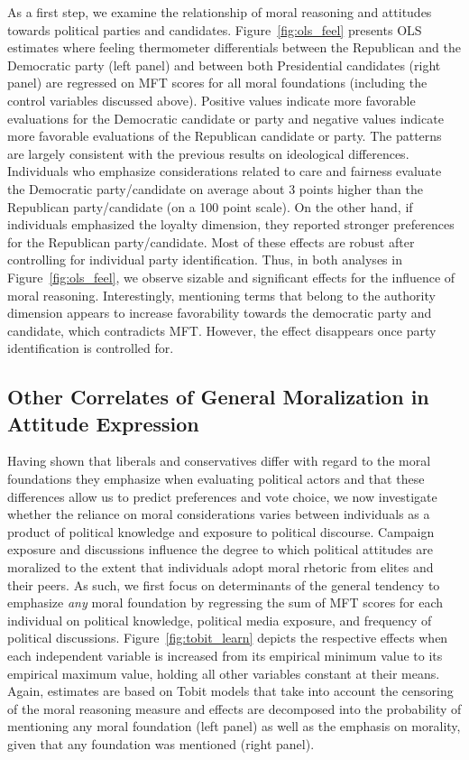 \documentclass[12pt]{article}
\begin{document}
As a first step, we examine the relationship of moral reasoning and attitudes towards political parties and candidates. Figure~\ref{fig:ols_feel} presents OLS estimates where feeling thermometer differentials between the Republican and the Democratic party (left panel) and between both Presidential candidates (right panel) are regressed on MFT scores for all moral foundations (including the control variables discussed above). Positive values indicate more favorable evaluations for the Democratic candidate or party and negative values indicate more favorable evaluations of the Republican candidate or party. The patterns are largely consistent with the previous results on ideological differences. Individuals who emphasize considerations related to care and fairness evaluate the Democratic party/candidate on average about 3 points higher than the Republican party/candidate (on a 100 point scale). On the other hand, if individuals emphasized the loyalty dimension, they reported stronger preferences for the Republican party/candidate. Most of these effects are robust after controlling for individual party identification. Thus, in both analyses in Figure~\ref{fig:ols_feel}, we observe sizable and significant effects for the influence of moral reasoning. Interestingly, mentioning terms that belong to the authority dimension appears to increase favorability towards the democratic party and candidate, which contradicts MFT. However, the effect disappears once party identification is controlled for.



\clearpage
\subsection{Other Correlates of General Moralization in Attitude Expression}

Having shown that liberals and conservatives differ with regard to the moral foundations they emphasize when evaluating political actors and that these differences allow us to predict preferences and vote choice, we now investigate whether the reliance on moral considerations varies between individuals as a product of political knowledge and exposure to political discourse. Campaign exposure and discussions influence the degree to which political attitudes are moralized to the extent that individuals adopt moral rhetoric from elites and their peers. As such, we first focus on determinants of the general tendency to emphasize \textit{any} moral foundation by regressing the sum of MFT scores for each individual on political knowledge, political media exposure, and frequency of political discussions. Figure~\ref{fig:tobit_learn} depicts the respective effects when each independent variable is increased from its empirical minimum value to its empirical maximum value, holding all other variables constant at their means. Again, estimates are based on Tobit models that take into account the censoring of the moral reasoning measure and effects are decomposed into the probability of mentioning any moral foundation (left panel) as well as the emphasis on morality, given that any foundation was mentioned (right panel).
\end{document}
